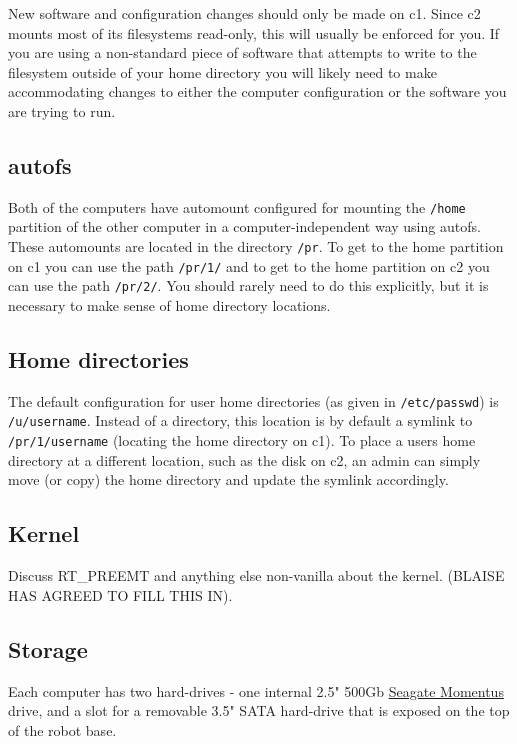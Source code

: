 New software and configuration changes should only be made on c1.
Since c2 mounts most of its filesystems read-only, this will usually
be enforced for you.  If you are using a non-standard piece of
software that attempts to write to the filesystem outside of your home
directory you will likely need to make accommodating changes to either
the computer configuration or the software you are trying to run.

\subsection{autofs}
Both of the computers have automount configured for mounting the
\texttt{/home} partition of the other computer in a
computer-independent way using autofs. These automounts are located in
the directory \texttt{/pr}. To get to the home partition on c1 you can
use the path \texttt{/pr/1/} and to get to the home partition on c2
you can use the path \texttt{/pr/2/}. You should rarely need to do
this explicitly, but it is necessary to make sense of home directory
locations.

\subsection{Home directories}
The default configuration for user home directories (as given in
\texttt{/etc/passwd}) is \texttt{/u/username}.  Instead of a
directory, this location is by default a symlink to
\texttt{/pr/1/username} (locating the home directory on c1).  To place
a users home directory at a different location, such as the disk on
c2, an admin can simply move (or copy) the home directory and update
the symlink accordingly.

\subsection{Kernel}
Discuss RT\_PREEMT and anything else non-vanilla about the kernel.
(BLAISE HAS AGREED TO FILL THIS IN).

\subsection{Storage}
Each computer has two hard-drives - one internal 2.5" 500Gb
\href{http://www.seagate.com/www/en-us/products/laptops/momentus/momentus_7200.4_g_force/}{Seagate
  Momentus} drive, and a slot for a removable 3.5" SATA hard-drive
that is exposed on the top of the robot base.

